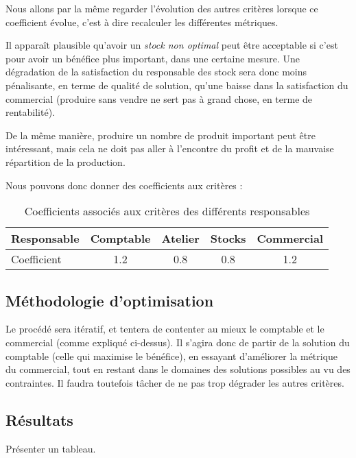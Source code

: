 Nous allons par la même regarder l'évolution des autres critères lorsque ce
coefficient évolue, c'est à dire recalculer les différentes métriques.

Il apparaît plausible qu'avoir un \emph{stock non optimal} peut être acceptable
si c'est pour avoir un bénéfice plus important, dans une certaine mesure. Une
dégradation de la satisfaction du responsable des stock sera donc moins
pénalisante, en terme de qualité de solution, qu'une baisse dans la satisfaction
du commercial (produire sans vendre ne sert pas à grand chose, en terme de
rentabilité).

De la même manière, produire un nombre de produit important peut être
intéressant, mais cela ne doit pas aller à l'encontre du profit et de la
mauvaise répartition de la production.

Nous pouvons donc donner des coefficients aux critères :

\begin{table}[h!]
\begin{center}
\begin{tabular}{|l||c|c|c|c|}
\hline
    Responsable & Comptable & Atelier &  Stocks & Commercial  \\
	\hline
    Coefficient & 1.2	    & 0.8     & 0.8	& 1.2 \\
	\hline
	\end{tabular}
	\end{center}
\caption{Coefficients associés aux critères des différents responsables}
\end{table}

\subsection{Méthodologie d'optimisation}
Le procédé sera itératif, et tentera de contenter au mieux le comptable et le
commercial (comme expliqué ci-dessus). Il s'agira donc de partir de la solution
du comptable (celle qui maximise le bénéfice), en essayant d'améliorer la
métrique du commercial, tout en restant dans le domaines des solutions possibles
au vu des contraintes. Il faudra toutefois tâcher de ne pas trop dégrader les
autres critères.



\subsection{Résultats}
Présenter un tableau.
